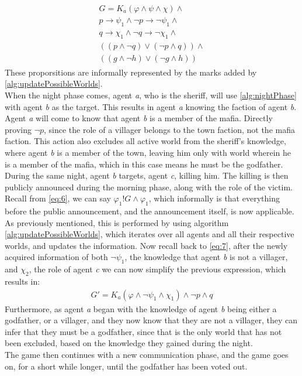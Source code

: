 \begin{align}
	\begin{split}
		G = K_a(\varphi \land \psi \land\chi)\land                        \\
		p \rightarrow \psi_1 \land \neg p \rightarrow \neg \psi_1 \land     \\
		q \rightarrow \chi_1 \land \neg q \rightarrow \neg \chi_1 \land \\
		((p \land \neg q) \lor (\neg p \land q)) \land                      \\
		((g \land \neg h) \lor (\neg g \land h))
		\label{eq:7}
	\end{split}
\end{align}
These proporsitions are informally represented by the marks added by \cref{alg:updatePossibleWorlds}.\\
When the night phase comes, agent \textit{a}, who is the sheriff, will use \cref{alg:nightPhase} with agent \textit{b} as the target. This results in agent \textit{a} knowing the faction of agent \textit{b}. Agent
\textit{a} will come to know that agent \textit{b} is a member of the mafia.
Directly proving $\neg p$, since the role of a villager belongs to the town
faction, not the mafia faction. This action also excludes all active world from
the sheriff's knowledge, where agent \textit{b} is a member of the town,
leaving him only with world wherein he is a member of the mafia, which in this
case means he must be the godfather. During the same night, agent \textit{b}
targets, agent \textit{c}, killing him. The killing is then publicly announced
during the morning phase, along with the role of the victim. Recall from
\cref{eq:6}, we can say $\varphi_1!G\land\varphi_1$, which informally is that
everything before the public announcement, and the announcement itself, is now
applicable. As previously mentioned, this is performed by using algorithm
\ref{alg:updatePossibleWorlds}, which iterates over all agents and all their
respective worlds, and updates the information. Now recall back to \cref{eq:7},
after the newly acquired information of both $\neg \psi_1$, the knowledge that
agent \textit{b} is not a villager, and $\chi_2$, the role of agent
\textit{c} we can now simplify the previous expression, which results in:
\begin{align}
	G' = K_a(\varphi \land \neg \psi_1 \land \chi_1) \land \neg p \land q
\end{align}
Furthermore, as agent \textit{a} began with the knowledge of agent \textit{b}
being either a godfather, or a villager, and they now know that they are not a
villager, they can infer that they must be a godfather, since that is the only
world that has not been excluded, based on the knowledge they gained during the
night. \\
The game then continues with a new communication phase, and the game goes on,
for a short while longer, until the godfather has been voted out.

